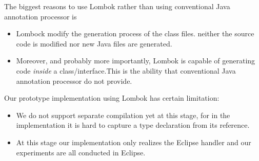 The biggest reasons to use Lombok rather than using conventional Java annotation
processor is
\begin{itemize}
\item Lombock modify the generation process of the class files.
neither the source code is modified nor new  Java files are generated.
\item Moreover, and probably more importantly, Lombok is capable of generating
  code \emph{inside} a class/interface.This is the ability that conventional
  Java annotation processor do not provide.
\end{itemize}

Our prototype implementation using Lombok has certain limitation: 
\begin{itemize}
\item We do not support separate compilation yet at this
  stage, for in the implementation it is hard to capture a type declaration from
  its reference.
\item At this stage our implementation only realizes the Eclipse handler and our experiments are all conducted in Eclipse.
\end{itemize}
